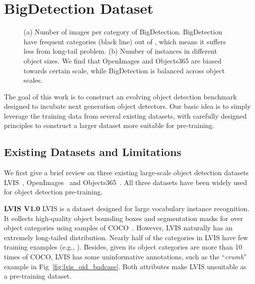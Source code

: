 \documentclass[10pt,twocolumn,letterpaper]{article}
\begin{document}
\section{BigDetection Dataset}
\label{sec:bigdet}
\begin{figure*}[t]
    \centering
    \vspace{-2ex}
    \caption{ (a) Number of images per category of BigDetection. BigDetection have  frequent categories (black line) out of , which means it suffers less from long-tail problem. (b) Number of instances in different object sizes. We find that OpenImages and Objects365 are biased towards certain scale, while BigDetection is balanced across object scales.}
    \label{fig:statistics}
    \vspace{-2ex}
\end{figure*} 
The goal of this work is to construct an evolving object detection benchmark designed to incubate next generation object detectors. Our basic idea is to simply leverage the training data from several existing datasets, with carefully designed principles to construct a larger dataset more suitable for pre-training. 

\subsection{Existing Datasets and Limitations}
\label{subsec:data_and_limit}
We first give a brief review on three existing large-scale object detection datasets LVIS~\cite{gupta2019lvis},  OpenImages~\cite{kuznetsova2020open} and Objects365~\cite{shao2019objects365}. All three datasets have been widely used for object detection pre-training. 

\vspace{1ex}
\noindent \textbf{LVIS V1.0} 
LVIS is a dataset designed for large vocabulary instance recognition. It collects high-quality object bounding boxes and segmentation masks for over  object categories using samples of COCO~\cite{lin2014microsoft}.
However, LVIS naturally has an extremely long-tailed distribution. Nearly half of the categories in LVIS have few training examples (e.g., ). 
Besides, given its object categories are more than 10 times of COCO, LVIS has some uninformative annotations, such as the ``\textit{crumb}'' example in Fig~\ref{fig:lvis_oid_badcase}. 
Both attributes make LVIS unsuitable as a pre-training dataset.
\end{document}

